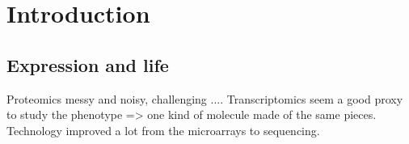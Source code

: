 \chapter{Introduction}
\section{Expression and life}

Proteomics messy and noisy, challenging ....
Transcriptomics seem a good proxy to study the phenotype => one kind of molecule made of the same pieces.
Technology improved a lot from the microarrays to sequencing.
